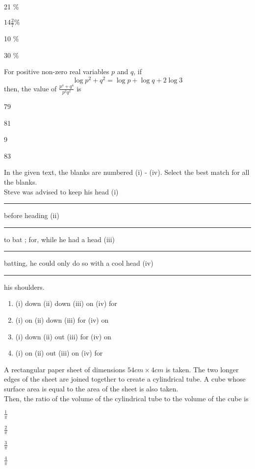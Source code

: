 		\begin{enumerate}
		\end{enumerate}
	\item For positive non-zero real variables $p$ and $q$, if 
		$$ \log{p^2 + q^2} = \log{p} + \log{q} + 2 \log{3} $$
		then, the value of $\frac{p^4 + q^4}{p^2 q^2}$ is
		\begin{enumerate}
				\begin{multicols}{4}
				\item 79
				\item 81
				\item 9
				\item 83
				\end{multicols}
		\end{enumerate}
	\item In the given text, the blanks are numbered (i) - (iv). Select the best match for all the blanks. \\
		Steve was advised to keep his head (i) \rule{1cm}{0.1pt} before heading (ii) \rule{1cm}{0.1pt} to bat ; for, while he had a head (iii) \rule{1cm}{0.1pt} batting, he could only do so with a cool head (iv) \rule{1cm}{0.1pt} his shoulders.
		\begin{enumerate}
			\item (i) down (ii) down (iii) on (iv) for
			\item (i) on (ii) down (iii) for (iv) on
			\item (i) down (ii) out (iii) for (iv) on
			\item (i) on (ii) out (iii) on (iv) for
		\end{enumerate}
	\item A rectangular paper sheet of dimensions $ 54 cm \times 4 cm$ is taken. The two longer edges of the sheet are joined together to create a cylindrical tube. A cube whose surface area is equal to the area of the sheet is also taken. \\
		Then, the ratio of the volume of the cylindrical tube to the volume of the cube is
		\begin{enumerate}
				\begin{multicols}{4}
				\item $\frac{1}{\pi}$
				\item $\frac{2}{\pi}$
				\item $\frac{3}{\pi}$
				\item $\frac{4}{\pi}$
				\end{multicols}
		\end{enumerate}
